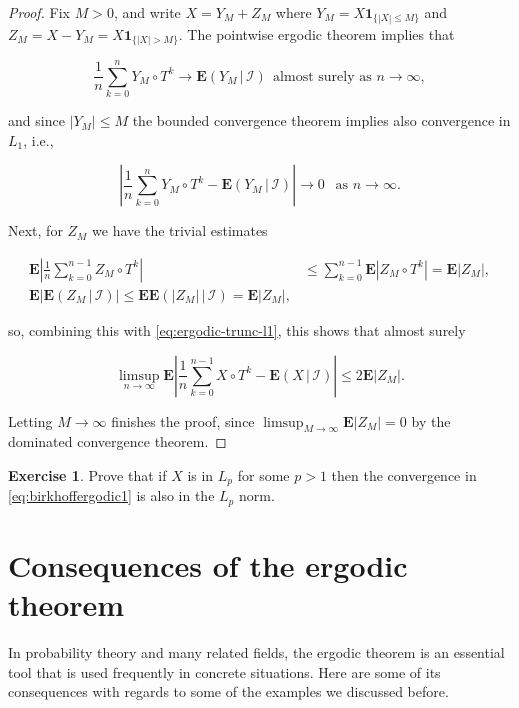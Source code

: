 \documentclass[11pt]{report}
\theoremstyle{plain}
\theoremstyle{definition}
\newtheorem{xexercise}[thm]{Exercise}
\begin{document}
\begin{proof}
Fix $M>0$, and write $X=Y_M + Z_M$ where
$Y_M = X \mathbf{1}_{\{|X|\le M\}}$ and
$Z_M = X-Y_M = X \mathbf{1}_{\{|X|>M\}}$. The
pointwise ergodic theorem implies that

\[
\frac{1}{n} \sum_{k=0}^n Y_M \circ T^k \to \mathbf{E}\left(Y_M\,|\,\mathcal{I}\right)
 \ \ \textrm{almost surely as }n\to\infty,
\]

\noindent and since $|Y_M|\le M$ the bounded convergence
theorem implies also convergence in $L_1$, i.e.,

\begin{equation*} \tag{20}\label{eq:ergodic-trunc-l1}
\left|\frac{1}{n} \sum_{k=0}^n Y_M \circ T^k - \mathbf{E}\left(Y_M\,|\,\mathcal{I}\right)\right| \to 0 \ \ \textrm{ as }n\to\infty.
\end{equation*}

\noindent Next, for $Z_M$ we have the trivial estimates

\begin{align*}
\mathbf{E} \left| \frac{1}{n} \sum_{k=0}^{n-1} Z_M \circ T^k \right|
& \le \sum_{k=0}^{n-1} \mathbf{E}|Z_M \circ T^k| = \mathbf{E}|Z_M|, \\
\mathbf{E} \left| \mathbf{E}\left(Z_M\,|\,\mathcal{I}\right) \right| \le \mathbf{E} \mathbf{E}\left(|Z_M|\,|\,\mathcal{I}\right) = \mathbf{E}|Z_M|,
\end{align*}

\noindent so, combining this with \eqref{eq:ergodic-trunc-l1}, this
shows that almost surely

\[
\limsup_{n\to\infty} \mathbf{E}\left| \frac{1}{n} \sum_{k=0}^{n-1} X\circ T^k - \mathbf{E}\left(X\,|\,\mathcal{I}\right)\right|
\le 2 \mathbf{E}|Z_M|.
\]

\noindent Letting $M\to\infty$ finishes the proof, since
$\limsup_{M\to\infty} \mathbf{E}|Z_M| = 0$ by the
dominated convergence theorem.
\end{proof}

\begin{xexercise}
Prove that if $X$ is in $L_p$ for some $p>1$ then the
convergence in \eqref{eq:birkhoffergodic1}  is also in the
$L_p$ norm.
\end{xexercise}

\section{Consequences of the ergodic theorem}

In probability theory and many related fields, the
ergodic theorem is an essential tool that is used
frequently in concrete situations. Here are some of
its consequences with regards to some of the examples
we discussed before.
\end{document}
